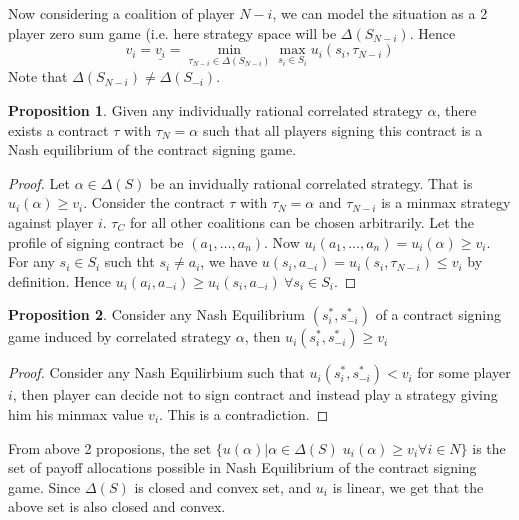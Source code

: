 \documentclass{article}
\theoremstyle{definition}
\newtheorem{prop}{Proposition}[section]
\begin{document}
Now considering a coalition of player $N-i$, we can model the situation as a 2 player zero sum game (i.e. here strategy space will be $\Delta(S_{N-i})$. Hence $$v_i = \underline{v_i} = \min_{\tau_{N-i} \in \Delta(S_{N-i})} \max_{s_i\in S_i} u_i(s_i,\tau_{N-i})$$ Note that $\Delta(S_{N-i}) \neq \Delta(S_{-i})$.
\begin{prop}
Given any individually rational correlated strategy $\alpha$, there exists a contract $\tau$ with $\tau_N = \alpha$ such that all players signing this contract is a Nash equilibrium of the contract signing game.
\end{prop}
\begin{proof}
Let $\alpha \in \Delta(S)$ be an invidually rational correlated strategy. That is $u_i(\alpha) \geq v_i$. Consider the contract $\tau$ with $\tau_N = \alpha$ and $\tau_{N-i}$ is a minmax strategy against player $i$. $\tau_C$ for all other coalitions can be chosen arbitrarily. Let the profile of signing contract be $(a_1,\dots,a_n)$. Now $u_i(a_1,\dots,a_n) = u_i(\alpha)\geq v_i$. For any $s_i\in S_i$ such tht $s_i\neq a_i$, we have $u(s_i,a_{-i}) = u_i(s_i,\tau_{N-i}) \leq v_i$ by definition. Hence $u_i(a_i,a_{-i}) \geq u_i(s_i,a_{-i}) ~\forall s_i \in S_i$.  
\end{proof}
\begin{prop}
Consider any Nash Equilibrium $(s_i^*,s_{-i}^*)$ of a contract signing game induced by correlated strategy $\alpha$, then $u_i(s_i^*,s_{-i}^*) \geq v_i$
\end{prop}
\begin{proof}
Consider any Nash Equilirbium such that $u_i(s_i^*,s_{-i}^*) <v_i$ for some player $i$, then player can decide not to sign contract and instead play a strategy giving him his minmax value $v_i$. This is a contradiction.
\end{proof}
From above 2 proposions, the set $\{u(\alpha)|\alpha \in \Delta(S) \; u_i(\alpha)\geq v_i\forall i\in N\}$ is the set of payoff allocations possible in Nash Equilibrium of the contract signing game. Since $\Delta(S)$ is closed and convex set, and $u_i$ is linear, we get that the above set is also closed and convex.
\end{document}
